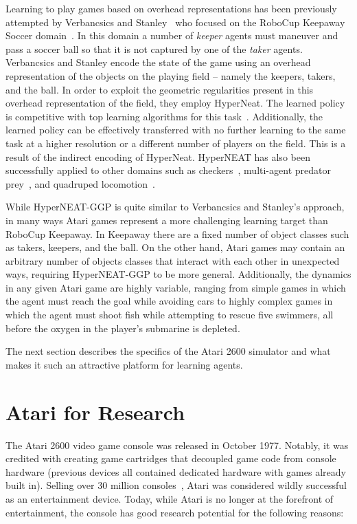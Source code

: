 \documentclass{acm_proc_article-sp}
\begin{document}
Learning to play games based on overhead representations has been previously attempted by Verbancsics and Stanley~\cite{verbancsics10} who focused on the RoboCup Keepaway Soccer domain~\cite{stone01}. In this domain a number of \textit{keeper} agents must maneuver and pass a soccer ball so that it is not captured by one of the \textit{taker} agents. Verbancsics and Stanley encode the state of the game using an overhead representation of the objects on the playing field -- namely the keepers, takers, and the ball. In order to exploit the geometric regularities present in this overhead representation of the field, they employ HyperNeat. The learned policy is competitive with top learning algorithms for this task~\cite{stone05}. Additionally, the learned policy can be effectively transferred with no further learning to the same task at a higher resolution or a different number of players on the field. This is a result of the indirect encoding of HyperNeat. HyperNEAT has also been successfully applied to other domains such as checkers~\cite{gauci08}, multi-agent predator prey~\cite{ambrosio08}, and quadruped locomotion~\cite{clune09}. 

While HyperNEAT-GGP is quite similar to Verbancsics and Stanley's approach, in many ways Atari games represent a more challenging learning target than RoboCup Keepaway. In Keepaway there are a fixed number of object classes such as takers, keepers, and the ball. On the other hand, Atari games may contain an arbitrary number of objects classes that interact with each other in unexpected ways, requiring HyperNEAT-GGP to be more general. Additionally, the dynamics in any given Atari game are highly variable, ranging from simple games in which the agent must reach the goal while avoiding cars to highly complex games in which the agent must shoot fish while attempting to rescue five swimmers, all before the oxygen in the player's submarine is depleted.

The next section describes the specifics of the Atari 2600 simulator and what makes it such an attractive platform for learning agents.

\section{Atari for Research}
\label{sec:atari}
The Atari 2600 video game console was released in October 1977. Notably, it was credited with creating game cartridges that decoupled game code from console hardware (previous devices all contained dedicated hardware with games already built in). Selling over 30 million consoles~\cite{atarihist}, Atari was considered wildly successful as an entertainment device. Today, while Atari is no longer at the forefront of entertainment, the console has good research potential for the following reasons:
\end{document}
